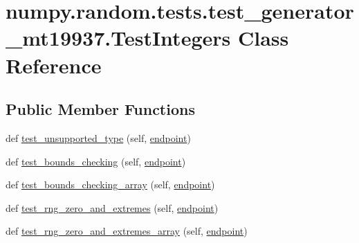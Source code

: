 \hypertarget{classnumpy_1_1random_1_1tests_1_1test__generator__mt19937_1_1TestIntegers}{}\section{numpy.\+random.\+tests.\+test\+\_\+generator\+\_\+mt19937.\+Test\+Integers Class Reference}
\label{classnumpy_1_1random_1_1tests_1_1test__generator__mt19937_1_1TestIntegers}
\subsection*{Public Member Functions}
\begin{DoxyCompactItemize}
\item 
def \hyperlink{classnumpy_1_1random_1_1tests_1_1test__generator__mt19937_1_1TestIntegers_a6e11166d08defbb83cc78d92276f92a5}{test\+\_\+unsupported\+\_\+type} (self, \hyperlink{namespacenumpy_1_1random_1_1tests_1_1test__generator__mt19937_a3cf8952087f960f78b86fcf9dc3f6a1e}{endpoint})
\item 
def \hyperlink{classnumpy_1_1random_1_1tests_1_1test__generator__mt19937_1_1TestIntegers_a8acb303ab4c444e353569330faad764c}{test\+\_\+bounds\+\_\+checking} (self, \hyperlink{namespacenumpy_1_1random_1_1tests_1_1test__generator__mt19937_a3cf8952087f960f78b86fcf9dc3f6a1e}{endpoint})
\item 
def \hyperlink{classnumpy_1_1random_1_1tests_1_1test__generator__mt19937_1_1TestIntegers_abe9040cbf19ebf51c566c7256dad2144}{test\+\_\+bounds\+\_\+checking\+\_\+array} (self, \hyperlink{namespacenumpy_1_1random_1_1tests_1_1test__generator__mt19937_a3cf8952087f960f78b86fcf9dc3f6a1e}{endpoint})
\item 
def \hyperlink{classnumpy_1_1random_1_1tests_1_1test__generator__mt19937_1_1TestIntegers_a9bef7a00d901e8d90a04067748fe452d}{test\+\_\+rng\+\_\+zero\+\_\+and\+\_\+extremes} (self, \hyperlink{namespacenumpy_1_1random_1_1tests_1_1test__generator__mt19937_a3cf8952087f960f78b86fcf9dc3f6a1e}{endpoint})
\item 
def \hyperlink{classnumpy_1_1random_1_1tests_1_1test__generator__mt19937_1_1TestIntegers_a6e971286782559e2c4f6332713b4e37d}{test\+\_\+rng\+\_\+zero\+\_\+and\+\_\+extremes\+\_\+array} (self, \hyperlink{namespacenumpy_1_1random_1_1tests_1_1test__generator__mt19937_a3cf8952087f960f78b86fcf9dc3f6a1e}{endpoint})
\item 

\end{DoxyCompactItemize}

